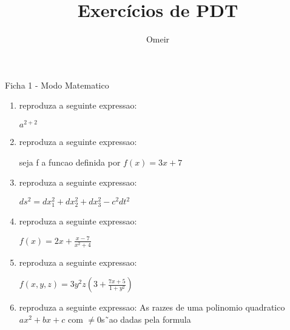 \documentclass[12pt,a4paper]{report}
\author{Omeir}
\title{Exercícios de PDT}
\begin{document}
\maketitle

\begin{center}
Ficha 1 - Modo Matematico
\end{center}

\begin{enumerate}
\item reproduza a seguinte expressao:
\begin{center}
\begin{math} a^{2+2} \end{math}
\end{center}

\item reproduza a seguinte expressao:
\begin{center}
seja f a funcao definida por \begin{math}  f(x)=3x+7 \end{math}
\end{center}

\item reproduza a seguinte expressao:
\begin{center}
\begin{math}  ds^2=dx_1^2+dx_2^2+dx_3^2-c^2dt^2 \end{math}
\end{center}

\item reproduza a seguinte expressao:
\begin{center}
\begin{math}  f(x)=2x+\frac{x-7}{x^2+4} \end{math}
\end{center}

\item reproduza a seguinte expressao:
\begin{center}
\begin{math}  f(x,y,z)=3y^2z(3+\frac{7x+5}{1+y^2}) \end{math}
\end{center}

\item reproduza a seguinte expressao:
As raızes de uma polinomio quadratico \begin{math}ax^2 + bx + c\end{math} com \begin{math} \neq 0 \end{math}s˜ao
dadas pela formula


\end{enumerate}
\end{document}

